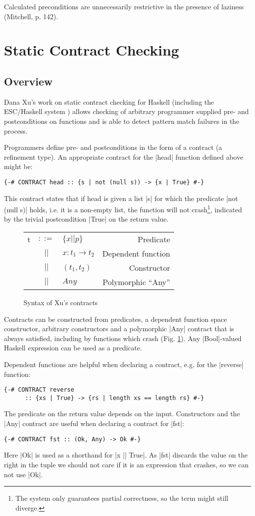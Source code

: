 Calculated preconditions are unnecessarily restrictive in the presence of laziness (Mitchell, p. 142).


\section{Static Contract Checking}
\subsection{Overview}
Dana Xu's work on static contract checking for Haskell \cite{Xu09staticcontract} (including the ESC/Haskell system \cite{Xu:2006:ESC:1159842.1159849}) allows checking of arbitrary programmer supplied pre- and postconditions on functions and is able to detect pattern match failures in the process.

Programmers define pre- and postconditions in the form of a contract (a refinement type). An appropriate contract for the |head| function defined above might be:
\begin{verbatim}
{-# CONTRACT head :: {s | not (null s)) -> {x | True} #-}
\end{verbatim}
This contract states that if head is given a list |s| for which the predicate |not (null s)| holds, i.e. it is a non-empty list, the function will not crash\footnote{The system only guarantees partial correctness, so the term might still diverge.}, indicated by the trivial postcondition |True| on the return value.

\begin{figure}
\centering
\begin{tabular}{lclr}
t &$::=$& $\{ x || p \}$     & Predicate          \\
  & $||$ & $x : t_1 \to t_2$ & Dependent function  \\
  & $||$ & $(t_1, t_2)$      & Constructor         \\
  & $||$ & $Any$             & Polymorphic ``Any''
\end{tabular}
\caption{Syntax of Xu's contracts}
\label{xu-contract-syntax}
\end{figure}

Contracts can be constructed from predicates, a dependent function space constructor, arbitrary constructors and a polymorphic |Any| contract that is always satisfied, including by functions which crash (Fig. \ref{xu-contract-syntax}). Any |Bool|-valued Haskell expression can be used as a predicate.

Dependent functions are helpful when declaring a contract, e.g. for the |reverse| function:
\begin{verbatim}
{-# CONTRACT reverse
      :: {xs | True} -> {rs | length xs == length rs} #-}
\end{verbatim}
The predicate on the return value depends on the input. Constructors and the |Any| contract are useful when declaring a contract for |fst|:
\begin{verbatim}
{-# CONTRACT fst :: (Ok, Any) -> Ok #-}
\end{verbatim}
Here |Ok| is used as a shorthand for |{x || True}|. As |fst| discards the value on the right in the tuple we should not care if it is an expression that crashes, so we can not use |Ok|.

